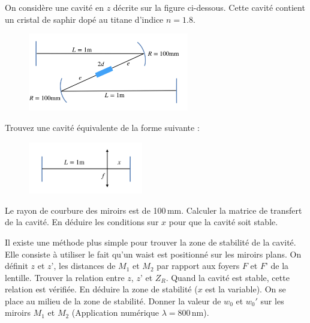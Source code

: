 \documentclass[12pt]{article}
\newenvironment{exercice}[2][Exercice]{\begin{trivlist}
\item[\hskip \labelsep {\bfseries #1}\hskip \labelsep {\bfseries #2.}]}{\end{trivlist}}
\begin{document}
\begin{exercice}{4}
On considère une cavité en $z$ décrite sur la figure ci-dessous. Cette cavité contient un cristal de saphir dopé au titane d'indice $n=1.8$.

 
\begin{figure}[!htbp]
\begin{center}
\includegraphics[width=7cm]{pictures/ZCav.png}
\end{center}
\end{figure}

Trouvez une cavité équivalente de la forme suivante :


 
\begin{figure}[!htbp]
\begin{center}
\includegraphics[width=5cm]{pictures/EqCav.png}
\end{center}
\end{figure}
Le rayon de courbure des miroirs est de 100$\,$mm. Calculer la matrice de transfert de la cavité. En déduire les conditions sur $x$ pour que la cavité soit stable.

Il existe une méthode plus simple pour trouver la zone de stabilité de la cavité. Elle consiste à utiliser le fait qu’un waist est positionné sur les miroirs plans. On définit $z$ et $z’$, les distances de $M_1$ et $M_2$ par rapport aux foyers $F$ et $F’$ de la lentille.
Trouver la relation entre $z$, $z’$ et $Z_R$.
Quand la cavité est stable, cette relation est vérifiée. En déduire la zone de stabilité ($x$ est la variable).
On se place au milieu de la zone de stabilité. Donner la valeur de $w_0$ et $w_0'$ sur les miroirs $M_1$ et $M_2$ (Application numérique $\lambda = 800\,$nm).

\end{exercice}
\end{document}

